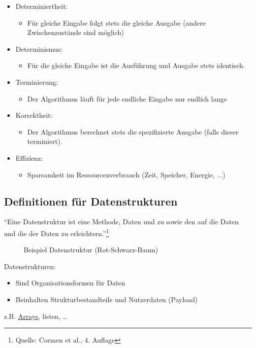 \documentclass[
    12pt,
    a4paper,
    ngerman,
    color=3b,%
    marginpar=false,
    colorback=false,
    leqno,
]{tudaexercise}
\begin{document}
\begin{itemize}
    \item Determiniertheit:\begin{itemize}
              \item Für gleiche Eingabe folgt stets die gleiche Ausgabe (andere Zwischenzustände sind möglich)
          \end{itemize}
    \item Determinismus:\begin{itemize}
              \item Für die gleiche Eingabe ist die Ausführung und Ausgabe stets identisch.
          \end{itemize}
    \item Terminierung:\begin{itemize}
              \item Der Algorithmus läuft für jede endliche Eingabe nur endlich lange
          \end{itemize}
    \item Korrektheit:\begin{itemize}
              \item Der Algorithmus berechnet stets die spezifizierte Ausgabe (falls dieser
                    terminiert).
          \end{itemize}
    \item Effizienz:\begin{itemize}
              \item Sparsamkeit im Ressourcenverbrauch (Zeit, Speicher, Energie, ...)
          \end{itemize}
\end{itemize}
\subsection{Definitionen für Datenstrukturen}\label{1.3}\label{Definitionen fuer Datenstrukturen}
"`Eine Datenstruktur ist eine Methode,
Daten  und zu  sowie
den  auf die Daten und die 
der Daten zu erleichtern."'\footnote{Quelle: Cormen et al., 4. Auflage}\\
\begin{wrapfigure}[5]{r}{.6\textwidth}
    \centering
    \caption{Beispiel Datenstruktur (Rot-Schwarz-Baum)}
    \label{fig:baum_beispiel}
\end{wrapfigure}
Datenstrukturen:\begin{itemize}
    \item Sind Organisationsformen für Daten
    \item Beinhalten Strukturbestandteile und Nutzerdaten (Payload)
\end{itemize}
z.B. \hyperref[2.2]{Arrays}, listen, \ldots
\vspace*{2cm}
\end{document}
